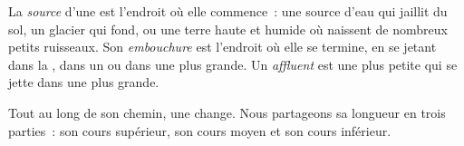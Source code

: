 \begin{definition}\label{def:g5:water-shapes-the-land:source-mouth}
La \emph{source} d'une  est
l'endroit où elle commence~: une source d'eau qui jaillit du sol, un
glacier qui fond, ou une terre haute et humide où naissent de nombreux
petits ruisseaux. Son \emph{embouchure} est l'endroit où
elle se termine, en se jetant dans la , dans un  ou dans une 
plus grande. Un \emph{affluent} est une  plus
petite qui se jette dans une plus grande.
\end{definition}

Tout au long de son chemin, une  change. Nous partageons sa
longueur en trois parties~: son cours supérieur, son cours moyen et son
cours inférieur.

